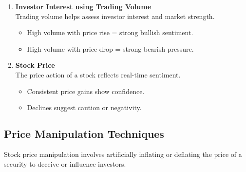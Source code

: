 \documentclass[12pt]{article}
\begin{document}
\begin{enumerate}
    \item \textbf{Investor Interest using Trading Volume}\\
    Trading volume helps assess investor interest and market strength.
    \begin{itemize}
        \item High volume with price rise = strong bullish sentiment.
        \item High volume with price drop = strong bearish pressure.
    \end{itemize}

    \item \textbf{Stock Price}\\
    The price action of a stock reflects real-time sentiment.
    \begin{itemize}
        \item Consistent price gains show confidence.
        \item Declines suggest caution or negativity.
    \end{itemize}
\end{enumerate}

\subsection{Price Manipulation Techniques}

Stock price manipulation involves artificially inflating or deflating the price of a security to deceive or influence investors.
\end{document}
